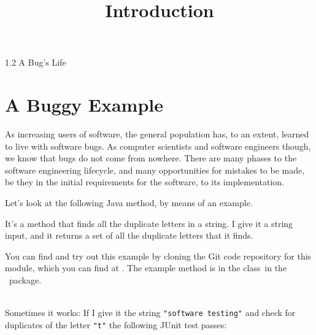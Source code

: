 



\title{Introduction}{1.2 A Bug's Life}

\section{A Buggy Example}


As increasing users of software, the general population has, to an extent,
learned to live with software bugs. As computer scientists and software
engineers though, we know that bugs do not come from nowhere. There are many
phases to the software engineering lifecycle, and many opportunities for
mistakes to be made, be they in the initial requirements for the software, to
its implementation.

Let's look at the following Java method, by means of an example.


It's a method that finds all the duplicate letters in a string. I give it a
string input, and it returns a set of all the duplicate letters that it finds.

You can find and try out this example by cloning the Git code repository for
this module, which you can find at \coderepourl. The example method is in
the class~\stringutilsbuggyoneclass in the \lecturespackage~package. 

\begin{center} 
\end{center}    
~\\

Sometimes it works: If I give it the string {\tt "software testing"} and check
for duplicates of the letter {\tt "t"} the following JUnit test passes:

\begin{center} 
\end{center} 

